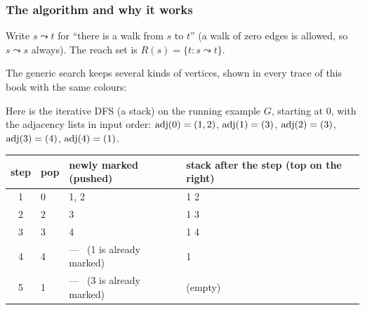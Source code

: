 \subsubsection*{The algorithm and why it works}

Write $s \leadsto t$ for ``there is a walk from $s$ to $t$'' (a walk of zero edges is allowed, so $s \leadsto s$ always). The reach set is $R(s) = \{ t : s \leadsto t\}$.

The generic search keeps several kinds of vertices, shown in every trace of this book with the same colours:
\begin{center}\small
{} \quad {} \quad {} \quad {} \quad {} \quad {}
\end{center}

Here is the iterative DFS (a stack) on the running example $G$, starting at $0$, with the adjacency lists in input order: $\operatorname{adj}(0)=(1,2)$, $\operatorname{adj}(1)=(3)$, $\operatorname{adj}(2)=(3)$, $\operatorname{adj}(3)=(4)$, $\operatorname{adj}(4)=(1)$.

\begin{table}[H]
\centering\small
\begin{tabular}{@{}clll@{}}
\toprule
\textbf{step} & \textbf{pop} & \textbf{newly marked (pushed)} & \textbf{stack after the step (top on the right)} \\
\midrule
1 & 0 & 1, 2 & 1 2 \\
2 & 2 & 3    & 1 3 \\
3 & 3 & 4    & 1 4 \\
4 & 4 & --- \ (1 is already marked) & 1 \\
5 & 1 & --- \ (3 is already marked) & (empty) \\
\bottomrule
\end{tabular}
\end{table}

